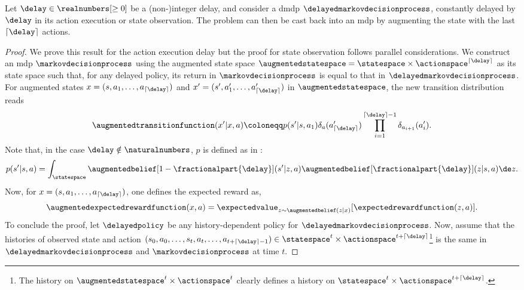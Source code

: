 \begin{prop}
\label{pp:equivalent_mdp_non_int}
    Let $\delay\in\realnumbers[\ge0]$ be a (non-)integer delay, and consider a \gls{dmdp} $\delayedmarkovdecisionprocess$, constantly delayed by $\delay$ in its action execution or state observation.  
    The problem can then be cast back into an \gls{mdp} by augmenting the state with the last $\lceil\delay\rceil$ actions.
\end{prop}
\begin{proof}
    We prove this result for the action execution delay but the proof for state observation follows parallel considerations. 
    We construct an \gls{mdp} $\markovdecisionprocess$ using the augmented state space $\augmentedstatespace=\statespace\times\actionspace^{\lceil\delay\rceil}$ as its state space such that, for any delayed policy, its return in $\markovdecisionprocess$ is equal to that in $\delayedmarkovdecisionprocess$.
    For augmented states $x=(s,a_1,\dots,a_{\lceil\delay\rceil})$ and $x'=(s',a_1',\dots,a_{\lceil\delay\rceil}')$ in $\augmentedstatespace$, the new transition distribution reads
    \begin{align*}
        \augmentedtransitionfunction(x'\vert x, a)\coloneqq 
        p(s'\vert s,a_1)\delta_a(a_{\lceil\delay\rceil}')\prod_{i=1}^{\lceil\delay\rceil-1}\delta_{a_{i+1}}(a_{i}').
    \end{align*}
    Note that, in the case $\delay\notin \naturalnumbers$, $p$ is defined as in :
    \begin{align}
        p(s'\vert s,a)=\int_{\statespace}   \augmentedbelief[1-\fractionalpart{\delay}](s'\vert z,a)\augmentedbelief[\fractionalpart{\delay}](z|s,a)\de z.
    \end{align}
    Now, for $x=(s,a_1,\dots,a_{\lceil\delay\rceil})$, one defines the expected reward as,
    \begin{align*}
        \augmentedexpectedrewardfunction(x,a) = \expectedvalue_{z\sim \augmentedbelief(z\vert x)}[\expectedrewardfunction(z,a)].
    \end{align*}
    To conclude the proof, let $\delayedpolicy$ be any history-dependent policy for $\delayedmarkovdecisionprocess$. Now, assume that the histories of observed state and action $(s_0,a_0,\dots,s_{t},a_t,\dots,a_{t+\lceil\delay\rceil-1})\in\statespace^t\times\actionspace^{t+\lceil\delay\rceil}$\footnote{The history on $\augmentedstatespace^t\times\actionspace^t$ clearly defines a history on $\statespace^t\times\actionspace^{t+\lceil\delay\rceil}$.} is the same in $\delayedmarkovdecisionprocess$ and $\markovdecisionprocess$ at time $t$. 

\end{proof}
